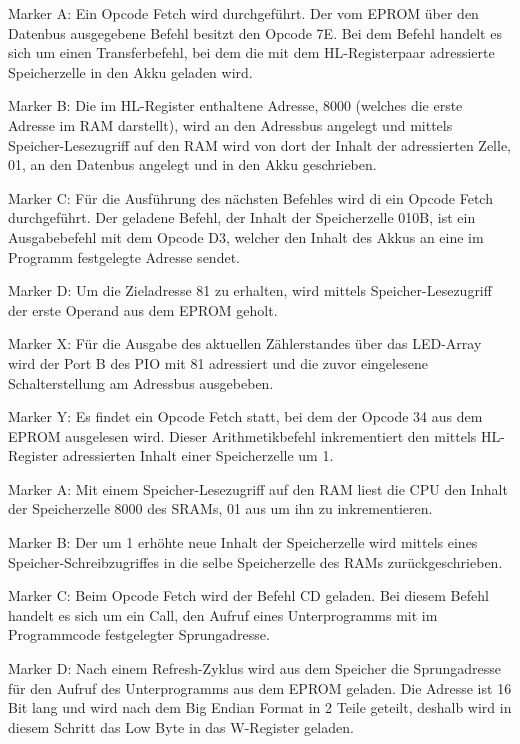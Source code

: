 Marker A: Ein Opcode Fetch wird durchgeführt. Der vom EPROM über den Datenbus ausgegebene Befehl besitzt den Opcode 7E. Bei dem Befehl handelt es sich um einen Transferbefehl, bei dem die mit dem HL-Registerpaar adressierte Speicherzelle in den Akku geladen wird.

Marker B: Die im HL-Register enthaltene Adresse, 8000 (welches die erste Adresse im RAM darstellt), wird an den Adressbus angelegt und mittels Speicher-Lesezugriff auf den RAM wird von dort der Inhalt der adressierten Zelle, 01, an den Datenbus angelegt und in den Akku geschrieben.

Marker C: Für die Ausführung des nächsten Befehles wird di ein Opcode Fetch durchgeführt. Der geladene Befehl, der Inhalt der Speicherzelle 010B, ist ein Ausgabebefehl mit dem Opcode D3, welcher den Inhalt des Akkus an eine im Programm festgelegte Adresse sendet.

Marker D: Um die Zieladresse 81 zu erhalten, wird mittels Speicher-Lesezugriff der erste Operand aus dem EPROM geholt.

Marker X: Für die Ausgabe des aktuellen Zählerstandes über das LED-Array wird der Port B des PIO mit 81 adressiert und die zuvor eingelesene Schalterstellung am Adressbus ausgebeben.

Marker Y: Es findet ein Opcode Fetch statt, bei dem der Opcode 34 aus dem EPROM ausgelesen wird. Dieser Arithmetikbefehl inkrementiert den mittels HL-Register adressierten Inhalt einer Speicherzelle um 1.

Marker A: Mit einem Speicher-Lesezugriff auf den RAM liest die CPU den Inhalt der Speicherzelle 8000 des SRAMs, 01 aus um ihn zu inkrementieren.

Marker B: Der um 1 erhöhte neue Inhalt der Speicherzelle wird mittels eines Speicher-Schreibzugriffes in die selbe Speicherzelle des RAMs zurückgeschrieben.

Marker C: Beim Opcode Fetch wird der Befehl CD geladen. Bei diesem Befehl handelt es sich um ein Call, den Aufruf eines Unterprogramms mit im Programmcode festgelegter Sprungadresse.

Marker D: Nach einem Refresh-Zyklus wird aus dem Speicher die Sprungadresse für den Aufruf des Unterprogramms aus dem EPROM geladen. Die Adresse ist 16 Bit lang und wird nach dem Big Endian Format in 2 Teile geteilt, deshalb wird in diesem Schritt das Low Byte in das W-Register geladen.

